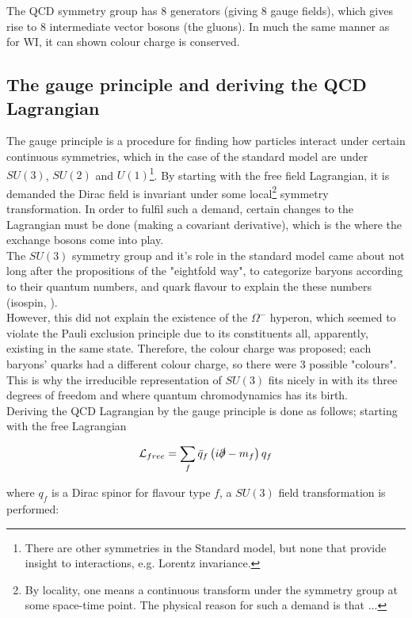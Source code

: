\documentclass[11pt,a4paper]{article}
\begin{document}
The QCD symmetry group has 8 generators (giving 8 gauge fields), which gives rise to 8 intermediate vector bosons (the gluons). In much the same manner as for WI, it can shown colour charge is conserved.

\subsection{The gauge principle and deriving the QCD Lagrangian}
The gauge principle is a procedure for finding how particles interact under certain continuous symmetries, which in the case of the standard model are under $SU(3)$, $SU(2)$ and $U(1)$\footnote{There are other symmetries in the Standard model, but none that provide insight to interactions, e.g. Lorentz invariance.}. By starting with the free field Lagrangian, it is demanded the Dirac field is invariant under some local\footnote{By locality, one means a continuous transform under the symmetry group at some space-time point. The physical reason for such a demand is that ...} symmetry transformation. In order to fulfil such a demand, certain changes to the Lagrangian must be done (making a covariant derivative), which is the where the exchange bosons come into play.\\

The $SU(3)$ symmetry group and it's role in the standard model came about not long after the propositions of the "eightfold way", to categorize baryons according to their quantum numbers, and quark flavour to explain the these numbers (isospin, ).\\
However, this did not explain the existence of the $\Omega^-$ hyperon, which seemed to violate the Pauli exclusion principle due to its constituents all, apparently, existing in the same state. Therefore, the colour charge was proposed; each baryons' quarks had a different colour charge, so there were 3 possible "colours". This is why the irreducible representation of $SU(3)$ fits nicely in with its three degrees of freedom and where quantum chromodynamics has its birth.\\

Deriving the QCD Lagrangian by the gauge principle is done as follows; starting with the free Lagrangian

\begin{equation}
	\mathcal{L}_{free} = \sum_f \bar{q}_f\left(i\slashed \partial - m_f\right)q_f
\end{equation}

where $q_f$ is a Dirac spinor for flavour type $f$, a $SU(3)$ field transformation is performed:
\end{document}
